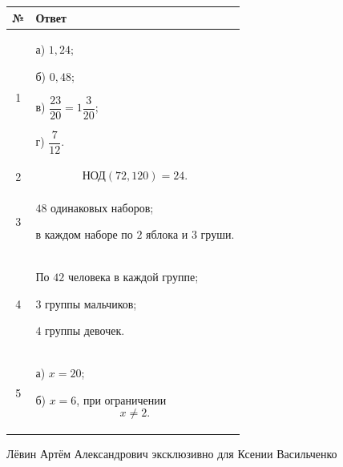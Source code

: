 \documentclass[a4paper,12pt]{article}
\begin{document}
\begin{table}[ht]

\centering

\begin{tabularx}{\linewidth}{
    @{}
    c
    X
    @{}
}

\toprule

\textbf{№}
&
\textbf{Ответ}
\\

\midrule

1
&
а) $1{,}24$;

б) $0{,}48$;

в) $\dfrac{23}{20}=1\dfrac3{20}$;

г) $\dfrac7{12}$.
\\[1mm]

2
&
\[
\text{НОД}(72,120)=24.
\]
\\

3
&
$48$ одинаковых наборов;

в каждом наборе по $2$ яблока
и $3$ груши.
\\

4
&
По $42$ человека в каждой группе;

$3$ группы мальчиков;

$4$ группы девочек.
\\

5
&
а) $x=20$;

б) $x=6$,
при ограничении
\[
x\ne2.
\]
\\

\bottomrule

\end{tabularx}

\end{table}

\vfill

\begin{center}

\small
\textcolor{textgray}{%
Лёвин Артём Александрович
эксклюзивно для Ксении Васильченко%
}

\end{center}
\end{document}
